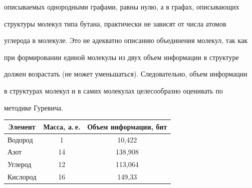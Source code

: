 описываемых однородными графами, равны нулю, а в графах, описывающих 


структуры молекул типа бутана, практически не зависят от числа атомов 


углерода в молекуле. Это не адекватно описанию объединения молекул, так как 


при формировании единой молекулы из двух объем информации в структуре 


должен возрастать (не может уменьшаться). Следовательно, объем информации 


в структурах молекул и в самих молекулах целесообразно оценивать по 


методике Гуревича.





      \begin{table}[b]\small %


      \vspace*{-9pt}


      \begin{center}




      \vspace*{2ex}


      


      \begin{tabular}{|l|c|c|}


      \hline


\multicolumn{1}{|c|}{Элемент}&Масса, а.\,е.&Объем информации, бит\\


\hline


Водород &\hphantom{9}1&\hphantom{9}10,422\\


Азот &14&138,908\\


Углерод&12&113,064\\


Кислород &16&149,33\hphantom{9}\\


\hline


\end{tabular}


\end{center}


\end{table}


